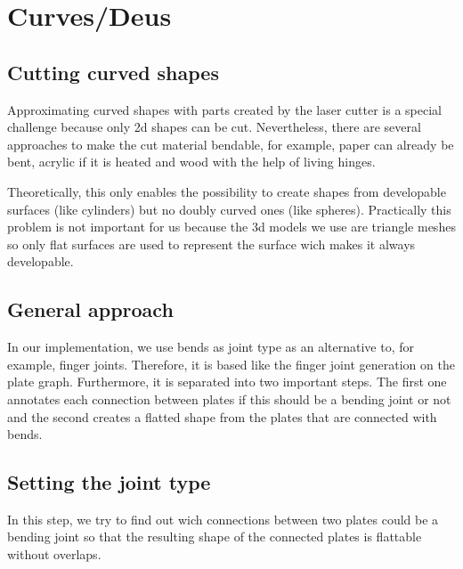 \documentclass[../ClassicThesis.tex]{subfiles}
\begin{document}
\chapter{Curves/Deus}\label{ch:curves}

\section{Cutting curved shapes}

Approximating curved shapes with parts created by the laser cutter is a special challenge because only 2d shapes can be cut. Nevertheless, there are several approaches to make the cut material bendable, for example, paper can already be bent, acrylic if it is heated and wood with the help of living hinges.

Theoretically, this only enables the possibility to create shapes from developable surfaces (like cylinders) but no doubly curved ones (like spheres). Practically this problem is not important for us because the 3d models we use are triangle meshes so only flat surfaces are used to represent the surface wich makes it always developable.

\section{General approach}

In our implementation, we use bends as joint type as an alternative to, for example, finger joints. Therefore, it is based like the finger joint generation on the plate graph. Furthermore, it is separated into two important steps. The first one annotates each connection between plates if this should be a bending joint or not and the second creates a flatted shape from the plates that are connected with bends.

\section{Setting the joint type}

In this step, we try to find out wich connections between two plates could be a bending joint so that the resulting shape of the connected plates is flattable without overlaps.
\end{document}
